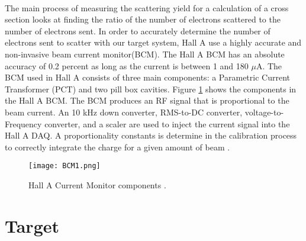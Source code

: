 	\paragraph{} The main process of measuring the scattering yield for a calculation of a cross section looks at finding the ratio of the number of electrons scattered to the number of electrons sent. In order to accurately determine the number of electrons sent to scatter with our target system, Hall A use a highly accurate and non-invasive beam current monitor(BCM). The Hall A BCM has an absolute accuracy of 0.2 percent as long as the current is between 1 and 180 $\mu$A. The BCM used in Hall A consists of three main components: a Parametric Current Transformer (PCT) and two pill box cavities. Figure \ref{BCMpng} shows the components in the Hall A BCM.  The BCM produces an RF signal that is proportional to the beam current. An 10 kHz down converter, RMS-to-DC converter, voltage-to-Frequency converter, and a scaler are used to inject the current signal into the Hall A DAQ. A proportionality constants is determine in the calibration process to correctly integrate the charge for a given amount of beam \cite{BCM1}. 
	  
	  	\begin{figure}[H]
	  	 	 		\centering
	  	 	 		\caption{Hall A Current Monitor components \cite{BCM1}. }
	  	 	 		\label{BCMpng}
	  	 	 		\texttt{[image: BCM1.png]} 
	  	\end{figure} 

	\paragraph{}	
	  
\section{Target}


